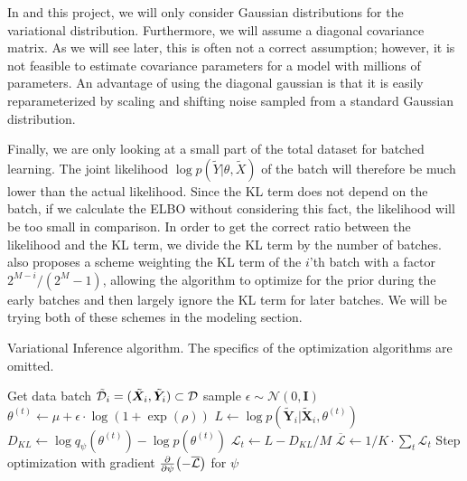 In \autocite{blundell_weight_2015} and this project, we will only consider Gaussian distributions for the variational distribution.
Furthermore, we will assume a diagonal covariance matrix. 
As we will see later, this is often not a correct assumption; however, it is not feasible to estimate covariance parameters for a model with millions of parameters. 
An advantage of using the diagonal gaussian is that it is easily reparameterized by scaling and shifting noise sampled from a standard Gaussian distribution.

Finally, we are only looking at a small part of the total dataset for batched learning.
The joint likelihood $\log p(\tilde{Y}|\theta,\tilde{X})$ of the batch will therefore be much lower than the actual likelihood. 
Since the KL term does not depend on the batch, if we calculate the ELBO without considering this fact, the likelihood will be too small in comparison.
In order to get the correct ratio between the likelihood and the KL term, we divide the KL term by the number of batches. 
\autocite{blundell_weight_2015} also proposes a scheme weighting the KL term of the $i$'th batch with a factor $2^{M-i}/(2^{M}-1)$, allowing the algorithm to optimize for the prior during the early batches and then largely ignore the KL term for later batches. 
We will be trying both of these schemes in the modeling section.

\begin{algorithm}[htbp]
    \caption{Variational Inference algorithm.
The specifics of the optimization algorithms are omitted.} \label{alg:vi}
    \begin{algorithmic}
        \State Get data batch $\tilde{\mathcal{D}}_i =(\tilde{\bm{X}}_i, \tilde{\bm{Y}}_i)\subset \mathcal{D}$
            \State sample $\epsilon \sim \mathcal{N}(0, \bm{I})$
            \State $\theta^{(t)} \gets \mu + \epsilon \cdot \log(1+\exp(\rho))$
            \State 
            $L \gets 
            \log{p(\tilde{\bm{Y}}_i|\tilde{\bm{X}}_i,\theta^{(t)})}$
            \State $D_{KL} \gets \log q_\psi(\theta^{(t)}) - \log{p(\theta^{(t)})}$
            \State $\mathcal{L}_t \gets L - D_{KL}/M $
        \EndFor
        \State $\overline{\mathcal{L}} \gets 1/K\cdot \sum_t \mathcal{L}_t$
        \State Step optimization with gradient $\pdv{\psi} (-\overline{\mathcal{L}})$ for $\psi$
        \EndFor
    \end{algorithmic}
\end{algorithm}